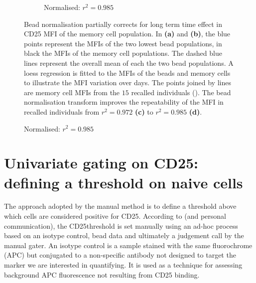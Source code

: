 \begin{figure}[ht]
\begin{subfigure}[b]{.4\textwidth}
    \caption{Normalised: $r^2=0.985$}
\end{subfigure}
{Bead normalisation partially corrects for long term time effect in CD25 MFI of the memory cell population.}
{
  In \textbf{(a)} and \textbf{(b)}, the blue points represent the  MFIs of the two lowest bead populations,
  in black the  MFIs of the memory cell populations.
  The dashed blue lines represent the overall mean of each the two bead populations.
  A loess regression is fitted to the MFIs of the beads and memory cells to illustrate the MFI variation over days.
  The points joined by lines are memory cell  MFIs from the $15$ recalled individuals ().
  The bead normalisation transform  improves the repeatability of the MFI in recalled individuals from $r^2=0.972$ \textbf{(c)} to $r^2=0.985$ \textbf{(d)}.
}
\end{figure}




\section{Univariate gating on CD25: defining a \positive threshold on naive cells}

The approach adopted by the manual method is to define a threshold above which cells are considered positive for CD25.
According to \citet{Dendrou:2009dv} (and  personal communication),
the CD25\positive threshold is set manually using an ad-hoc process based on an isotype control, bead data and ultimately a judgement call
by the manual gater.
An isotype control is a sample stained with the same fluorochrome (APC) but conjugated to a
non-specific antibody not designed to target the marker we are interested in quantifying.
It is used as a technique for assessing background APC fluorescence not resulting from CD25 binding.

